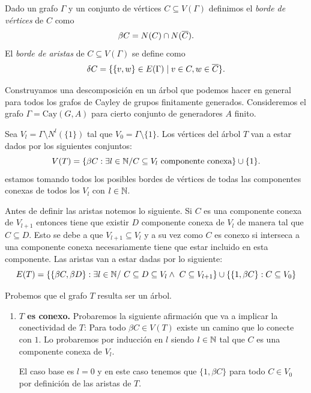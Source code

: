 \documentclass[tesis.tex]{subfiles}
\begin{document}
\begin{deff}
	Dado un grafo $\Gamma$ y un conjunto de vértices $C \subseteq V(\Gamma)$ definimos el \emph{borde de vértices} de $C$ como
	\[
	\beta C =  N(C) \cap N(\overline{ C}).
	\] 
	El \emph{borde de aristas} de $C \subseteq V(\Gamma)$ se define como
	\[
	\delta C = \{  \{v,w \} \in E(\Gamma) \mid v \in C, w \in \overline C    \}.
	\]
\end{deff}


\begin{obs}\label{desc-grafo-cayley}%
	
	Construyamos una descomposición en un árbol que podemos hacer en general para todos los grafos de Cayley de grupos finitamente generados. 
	Consideremos el grafo $\Gamma = \text{Cay}(G,A)$ para cierto conjunto de generadores $A$ finito.
		
	
	Sea $V_l = \Gamma \setminus N^l(\{1\}) $ tal que $V_0 = \Gamma \setminus \{1\}$. 
	Los vértices del árbol $T$ van a estar dados por los siguientes conjuntos:
	\[
	V(T) = \{  \beta C : \exists l \in \mathbb{N} / C \subseteq V_l \ \text{componente conexa} \} \cup \{ 1 \}.
	\]
	estamos tomando todos los posibles bordes de vértices 
	de todas las componentes conexas de todos los $V_l$ con $l \in \mathbb{N}$.
	 
	Antes de definir las aristas notemos lo siguiente.
	Si $C$ es una componente conexa de $V_{l+1}$ entonces tiene que existir $D$ componente conexa de $V_{l}$ de manera tal que $C \subseteq D$.
	Esto se debe a que $V_{l+1} \subseteq V_{l}$ y a su vez como $C$ es conexo si interseca a una componente conexa necesariamente tiene que estar incluido en esta componente.
	Las aristas van a estar dadas por lo siguiente:
	\[
	E(T) = \{ \{ \beta C, \beta D \} : \exists l \in \mathbb{N} / \ C \subseteq D \subseteq V_l \land \ C \subseteq V_{l+1}  \} \cup \{  \{1,\beta C\} : C \subseteq V_0  \}
	\]
	
	Probemos que el grafo $T$ resulta ser un árbol. 
	
	\begin{enumerate}[$\bullet$]
		\item \textbf{$T$ es conexo.}
		Probaremos la siguiente afirmación que va a implicar la conectividad de $T$:
		Para todo $\beta C \in V(T)$ existe un camino que lo conecte con $1$.
		Lo probaremos por inducción en $l$ siendo $l \in \mathbb{N}$ tal que $C$ es una componente conexa de $V_{l}$.
		
		El caso base es $l = 0$ y en este caso tenemos que $\{ 1, \beta C  \}$ para todo $C \in V_{0}$ por definición de las aristas de $T$.
		

\end{enumerate}
\end{obs}
\end{document}
